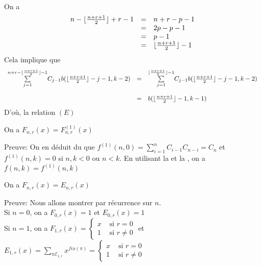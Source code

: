 \vspace{10pt}\\
On a
\[
	\begin{array}{l l l}
		n-\lfloor \frac{n+r+1}{2}\rfloor+r-1 & = & n+r-p-1 \\&=&2p-p-1\\&=&p-1\\&=&\lfloor \frac{n+r+1}{2}\rfloor-1
	\end{array}
\]
Cela implique que
\[
	\begin{array}{l l l}
		\underset{j=1}{\overset{n+r-\lfloor \frac{n+r+1}{2} \rfloor-1}{\sum}}C_{j-1}b(\lfloor \frac{n+r+1}{2} \rfloor-j-1,k-2) & =        & \underset{j=1}{\overset{\lfloor \frac{n+r+1}{2} \rfloor-1}{\sum}}C_{j-1}b(\lfloor \frac{n+r+1}{2} \rfloor-j-1,k-2) \\
		                                                                                                                       & \text{ } &                                                                                                                    \\
		                                                                                                                       & =        & b( \lfloor \frac{n+r+1}{2} \rfloor -1 , k-1)
	\end{array}
\]
D’où, la relation $(E)$
\begin{corollaire}
	On a $F_{n, r}(x) =  F^{(1)}_{n,r}(x)$
\end{corollaire}
Preuve: On en déduit du  que $f^{(1)}(n, 0) = \sum\limits_{i=1}^{n}C_{i-1}C_{n-i}= C_{n}$ et $f^{(1)}(n, k)=0$ si $n, k < 0$ ou $n<k$. En utilisant la  et la , on a $f(n, k)=f^{(1)}(n, k)$
\begin{corollaire}
	On a $F_{n, r}(x) = E_{n, r}(x)$
\end{corollaire}
Preuve: Nous allons montrer par récurrence sur $n$. \\
Si $n=0$, on a  $F_{0, r}(x)=1$ et $E_{0, r}(x)=1$\\
Si $n=1$, on a $F_{1, r}(x)=\begin{cases}
		x & \text{ si } r=0     \\
		1 & \text{ si } r\neq 0
	\end{cases}$ et $E_{1, r}(x)= \sum\limits_{\pi \mathcal{E}_{1,r}}x^{fix(\pi)} =\begin{cases}
		x & \text{ si } r=0     \\
		1 & \text{ si } r\neq 0
	\end{cases}$\\
